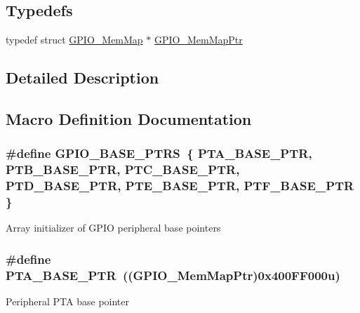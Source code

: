 \subsection*{Typedefs}
\begin{DoxyCompactItemize}
\item 
typedef struct \hyperlink{struct_g_p_i_o___mem_map}{G\+P\+I\+O\+\_\+\+Mem\+Map} $\ast$ \hyperlink{group___g_p_i_o___peripheral_ga31c1eddda45aa085f51142987e05ada5}{G\+P\+I\+O\+\_\+\+Mem\+Map\+Ptr}
\end{DoxyCompactItemize}


\subsection{Detailed Description}


\subsection{Macro Definition Documentation}
\hypertarget{group___g_p_i_o___peripheral_gad0f7206167a584b1e75a81a5c30fa1c2}{}
\subsubsection[{G\+P\+I\+O\+\_\+\+B\+A\+S\+E\+\_\+\+P\+T\+R\+S}]{\setlength{\rightskip}{0pt plus 5cm}\#define G\+P\+I\+O\+\_\+\+B\+A\+S\+E\+\_\+\+P\+T\+R\+S~\{ {\bf P\+T\+A\+\_\+\+B\+A\+S\+E\+\_\+\+P\+T\+R}, {\bf P\+T\+B\+\_\+\+B\+A\+S\+E\+\_\+\+P\+T\+R}, {\bf P\+T\+C\+\_\+\+B\+A\+S\+E\+\_\+\+P\+T\+R}, {\bf P\+T\+D\+\_\+\+B\+A\+S\+E\+\_\+\+P\+T\+R}, {\bf P\+T\+E\+\_\+\+B\+A\+S\+E\+\_\+\+P\+T\+R}, {\bf P\+T\+F\+\_\+\+B\+A\+S\+E\+\_\+\+P\+T\+R} \}}\label{group___g_p_i_o___peripheral_gad0f7206167a584b1e75a81a5c30fa1c2}
Array initializer of G\+P\+I\+O peripheral base pointers \hypertarget{group___g_p_i_o___peripheral_gadf98f6ee2bbfd42102e378a66b29b9ef}{}
\subsubsection[{P\+T\+A\+\_\+\+B\+A\+S\+E\+\_\+\+P\+T\+R}]{\setlength{\rightskip}{0pt plus 5cm}\#define P\+T\+A\+\_\+\+B\+A\+S\+E\+\_\+\+P\+T\+R~(({\bf G\+P\+I\+O\+\_\+\+Mem\+Map\+Ptr})0x400\+F\+F000u)}\label{group___g_p_i_o___peripheral_gadf98f6ee2bbfd42102e378a66b29b9ef}
Peripheral P\+T\+A base pointer \hypertarget{group___g_p_i_o___peripheral_ga59ab0f28e891ea28f152505ce2021747}{}
